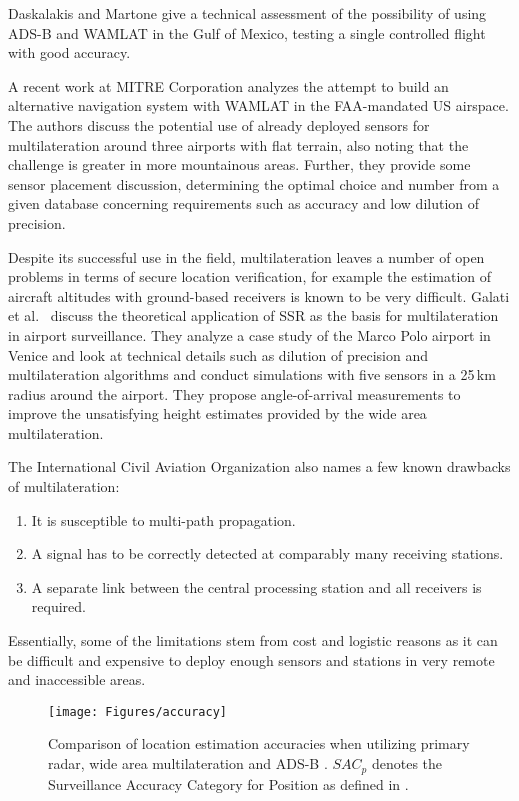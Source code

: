 \documentclass[english]{IEEEtran}
\begin{document}
Daskalakis and Martone \cite{Daskalakis2003} give a technical assessment
of the possibility of using ADS-B and WAMLAT in the Gulf of Mexico,
testing a single controlled flight with good accuracy. 

A recent work at MITRE Corporation \cite{Niles2012} analyzes the
attempt to build an alternative navigation system with WAMLAT in the
FAA-mandated US airspace. The authors discuss the potential use of
already deployed sensors for multilateration around three airports
with flat terrain, also noting that the challenge is greater in more
mountainous areas. Further, they provide some sensor placement discussion,
determining the optimal choice and number from a given database concerning
requirements such as accuracy and low dilution of precision. 

Despite its successful use in the field, multilateration leaves a
number of open problems in terms of secure location verification,
for example the estimation of aircraft altitudes with ground-based
receivers is known to be very difficult. Galati et al.~\cite{Galati2005}
discuss the theoretical application of SSR as the basis for multilateration
in airport surveillance. They analyze a case study of the Marco Polo
airport in Venice and look at technical details such as dilution of
precision and multilateration algorithms and conduct simulations with
five sensors in a 25\,km radius around the airport. They propose
angle-of-arrival measurements to improve the unsatisfying height estimates
provided by the wide area multilateration. 

The International Civil Aviation Organization also names a few known
drawbacks of multilateration: \cite{Siu2011}
\begin{enumerate}
\item It is susceptible to multi-path propagation.
\item A signal has to be correctly detected at comparably many receiving
stations.
\item A separate link between the central processing station and all receivers
is required. 
\end{enumerate}
Essentially, some of the limitations stem from cost and logistic reasons
as it can be difficult and expensive to deploy enough sensors and
stations in very remote and inaccessible areas. 

\begin{figure}
\texttt{[image: Figures/accuracy]}

\caption{Comparison of location estimation accuracies when utilizing primary
radar, wide area multilateration and ADS-B \cite{Smith2006}. \label{fig:Comparison-of-location}
$SAC_{p}$ denotes the Surveillance Accuracy Category for Position
as defined in \cite{Smith2006}.}
\end{figure}
\end{document}
